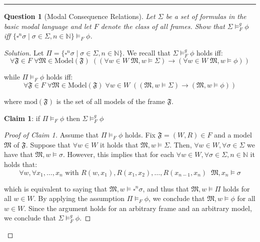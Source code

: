 \documentclass[12pt,a4paper]{report}
\newtheorem{question}{Question}
\theoremstyle{definition}
\newcommand{\N}{\mathbb{N}}                     %
\newcommand{\model}[1]{\mathfrak{#1}}           %
\begin{document}
    \quad

    \hrule

    \quad

    \newpage

    \begin{question}[Modal Consequence Relations]
        Let $\Sigma$ be a set of formulas in the basic modal language and let $F$ denote the class of all frames. Show that $\Sigma \models^g_F \phi$ iff $\{\square^n \sigma \mid \sigma \in \Sigma, n \in \N\} \models_F \phi$.
    \end{question}

    \begin{proof}[Solution]
        Let $\Pi = \{\square^n \sigma \mid \sigma \in \Sigma, n \in \N\}$. We recall that $\Sigma \models^g_F \phi$ holds iff:
        \[\forall \model F \in F \; \forall \model M \in \mathrm{Model}(\model F) \; ((\forall w \in W \; \model M, w \models \Sigma) \to (\forall w \in W \; \model M, w \models \phi))\]

        while $\Pi \models_F \phi$ holds iff:
        \[\forall \model F \in F \; \forall \model M \in \mathrm{Model}(\model F) \; \forall w \in W \;((\model M, w \models \Sigma) \to (\model M, w \models \phi))\]

        where $\mathrm{mod}(\model F)$ is the set of all models of the frame $\model F$.

        \textbf{Claim 1}: if $\Pi \models_F \phi$ then $\Sigma \models^g_F \phi$

        \begin{proof}[Proof of Claim 1]
            Assume that $\Pi \models_F \phi$ holds. Fix $\model{F} = (W,R)\in F$ and a model $\model{M}$ of $\model{F}$. Suppose that $\forall w \in W$ it holds that $\model M, w \models \Sigma$. Then,  $\forall w \in W, \forall \sigma \in \Sigma$ we have that $\model M, w \models \sigma$. However, this implies that for each $\forall w \in W, \forall \sigma \in \Sigma, n \in \N$ it holds that:
            \[\forall w, \forall x_1, \ldots, x_n \text{ with } R(w,x_1), R(x_1, x_2), \ldots, R(x_{n-1}, x_n) \;\; \model M, x_n \models \sigma\]

            which is equivalent to saying that $\model M, w \models \square^n \sigma$, and thus that $\model M, w \models \Pi$ holds for all $w \in W$. By applying the assumption $\Pi \models_F \phi$, we conclude that $\model M, w \models \phi$ for all $w \in W$. Since the argument holds for an arbitrary frame and an arbitrary model, we conclude that $\Sigma \models^g_F \phi$.
        \end{proof}


\end{proof}
\end{document}
